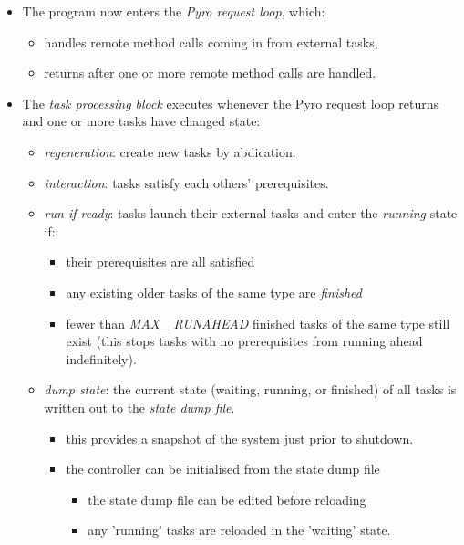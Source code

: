 \documentclass[12pt]{article}
\begin{document}
\begin{itemize}
\item The program now enters the {\em Pyro request loop}, which:
    \begin{itemize}
    \item handles remote method calls coming in from external tasks, 
    \item returns after one or more remote method calls are handled. 
    \end{itemize}

\item The {\em task processing block} executes whenever the Pyro request
loop returns and one or more tasks have changed state: 
    \begin{itemize} 
    \item {\em regeneration}: create new tasks by abdication.

    \item {\em interaction}: tasks satisfy each others' prerequisites. 

    \item {\em run if ready}: tasks launch their external tasks and
    enter the {\em running} state if:
        \begin{itemize}
        \item their prerequisites are all satisfied
        \item any existing older tasks of the same type are {\em
        finished} 
        \item fewer than {\em MAX\_ RUNAHEAD} finished tasks of the
        same type still exist (this stops tasks with no prerequisites
        from running ahead indefinitely).
        \end{itemize}

    \item {\em dump state}: the current state (waiting, running, or
    finished) of all tasks is written out to the {\em state dump file}.
        \begin{itemize}
        \item this provides a snapshot of the system just prior to shutdown.

        \item the controller can be initialised from the state dump file
            \begin{itemize}
            \item the state dump file can be edited before reloading

            \item any 'running' tasks are reloaded in the 'waiting' state.
            \end{itemize}
        \end{itemize}


\end{itemize}
\end{itemize}
\end{document}
